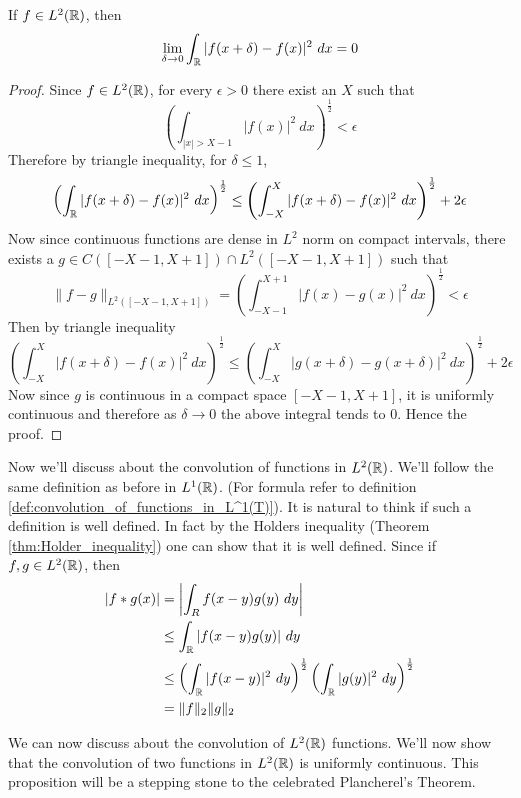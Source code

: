 \begin{proposition}
  \label{prop:L2_functions_are_continuous_in_L2_norm_in_R}
  If $f\in L^2(\mathbb R)$, then $$\lim_{\delta \to 0} \int_\mathbb R |f(x+\delta) - f(x)|^2 \ dx = 0 $$
\end{proposition}
\begin{proof}
  Since $f\in L^2(\mathbb R)$, for every $\epsilon > 0$ there exist an $X$ such that $$\left( \int_{|x|> X-1} |f(x)|^2 \ dx \right)^{\frac{1}{2}} < \epsilon$$
  Therefore by triangle inequality, for $\delta \le 1$, $$ \left( \int_\mathbb R |f(x+\delta) - f(x)|^2 \ dx \right)^{\frac{1}{2}} \le \left( \int_{-X}^X |f(x+\delta) - f(x)|^2 \ dx \right)^{\frac{1}{2}} + 2\epsilon$$
  Now since continuous functions are dense in $L^2$ norm on compact intervals, there exists a $g \in C([-X-1, X+1])\cap L^2([-X-1, X+1])$ such that $$ \|f-g\|_{L^2([-X-1, X+1])} = \left( \int_{-X-1}^{X+1} |f(x) - g(x)|^2 \ dx \right)^{\frac{1}{2}} < \epsilon $$
  Then by triangle inequality $$ \left( \int_{-X}^X |f(x+\delta) - f(x)|^2 \ dx \right)^{\frac{1}{2}} \le \left( \int_{-X}^X |g(x+\delta) - g(x+\delta)|^2 \ dx \right)^{\frac{1}{2}} + 2\epsilon $$
  Now since $g$ is continuous in a compact space $[-X-1, X+1]$, it is uniformly continuous and therefore as $\delta \to 0$ the above integral tends to $0$. Hence the proof.
\end{proof}

Now we'll discuss about the convolution of functions in $L^2(\mathbb R)$. We'll follow the same definition as before in $L^1(\mathbb R)$. (For formula refer to definition \ref{def:convolution_of_functions_in_L^1(T)}). It is natural to think if such a definition is well defined. In fact by the Holders inequality (Theorem \ref{thm:Holder_inequality}) one can show that it is well defined. Since if $f, g \in L^2(\mathbb R)$, then 
  \begin{align*}
    |f*g(x)| &= \left|\int_R f(x-y)g(y) \ dy \right|\\
        &\le \int_\mathbb R |f(x-y)g(y)| \ dy \\
        &\le \left(\int_\mathbb R |f(x-y)|^2 \ dy \right)^{\frac{1}{2}} \left(\int_\mathbb R |g(y)|^2 \ dy \right)^{\frac{1}{2}} \\
        &= \|f\|_2 \|g\|_2
  \end{align*}

We can now discuss about the convolution of $L^2(\mathbb R)$ functions. We'll now show that the convolution of two functions in $L^2(\mathbb R)$ is uniformly continuous. This proposition will be a stepping stone to the celebrated Plancherel's Theorem.

